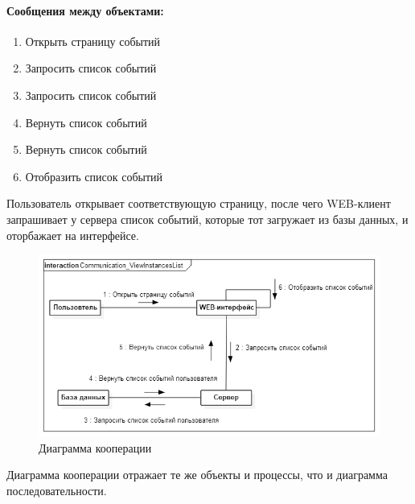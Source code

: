 \documentclass{article}
\begin{document}
        \paragraph{Сообщения между объектами:}
        \begin{enumerate}
            \item Открыть страницу событий
            \item Запросить список событий
            \item Запросить список событий
            \item Вернуть список событий
            \item Вернуть список событий
            \item Отобразить список событий
        \end{enumerate}
        Пользователь открывает соответствующую страницу, после чего
        WEB-клиент запрашивает у сервера список событий, которые тот
        загружает из базы данных, и оторбажает на интерфейсе.

        \begin{figure}[H]
            \includegraphics[width=\textwidth, center]
                {Communication_ViewInstancesList}
            \caption{Диаграмма кооперации}
        \end{figure}

        Диаграмма кооперации отражает те же объекты и процессы, что и диаграмма
        последовательности.
\end{document}
